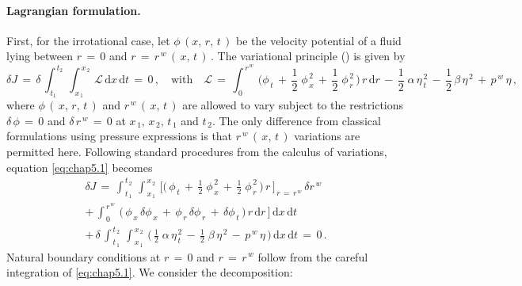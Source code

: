 \documentclass[alpha-refs, 12pt]{wiley-article}
\begin{document}
\paragraph{Lagrangian formulation.} First, for the irrotational case, let $\phi\,(x,\,r,\,t\,)$ be the velocity potential of a fluid lying between $r\,=\,0$ and $r\,=\,r^{\,w}\,(\,x,\,t\,)\,$. The variational principle (\cite{Luke1967}) is given by
\begin{equation}\label{eq:chap5.1}
  \delta J\,=\,\delta\,\int_{\,t_{1}}^{\,t_{2}}\,\int_{\,x_{\,1}}^{\,x_{\,2}}\,\mathcal{L}\,\mathrm{d}x\,\mathrm{d}t\,=\,0\,,\quad \text{with} \quad \mathcal{L}\,=\,\int_{\,0}^{\,r^{\,w}}\,\biggl(\phi_{\,t} \,+\,\frac{1}{2}\;\phi_{\,x}^{\,2} \,+\,\frac{1}{2}\;\phi_{\,r}^{\,2}\,\biggr)\,r\,\mathrm{d}r\,-\,\frac{1}{2}\;\alpha\,\eta_{\,t}^{\,2} \,-\,\frac{1}{2}\,\beta\,\eta^{\,2}\,+\,p^{\,w}\,\eta\,,
\end{equation}
where $\phi\,(\,x,\,r,\,t\,)$ and $r^{\,w}\,(\,x,\,t\,)$ are allowed to vary subject to the restrictions $\delta\,\phi\,=\,0$ and $\delta \,r^{\,w}\,=\,0$ at $x_{\,1},\,x_{\,2},\,t_{\,1}$ and $t_{\,2}$. The only difference from classical formulations using pressure expressions is that $r^{\,w}\,(\,x,\,t\,)$ variations are permitted here. Following standard procedures from the calculus of variations, equation \eqref{eq:chap5.1} becomes
\begin{multline}
  \delta J\,=\,\int_{\,t_{\,1}}^{\,t_{\,2}}\,\int_{\,x_{\,1}}^{\,x_{\,2}}\,\Biggl[\biggl(\,\phi_{\,t}\,+\,\frac{1}{2}\;\phi_{\,x}^{\,2}\,+\,\frac{1}{2}\;\phi_{\,r}^{\,2}\,\biggr)\,r\,\Biggr]_{\,r\,=\,r^{\,w}}\,\delta r^{\,w}
  \\[0.5em]
  +\,\int_{\,0}^{\,r^{\,w}}\,\bigl(\,\phi_{\,x}\,\delta \phi_{\,x}\,+\,\phi_{\,r}\,\delta \phi_{\,r}\,+\,\delta \phi_{\,t}\,\bigr)\,r\,\mathrm{d}r\,\Biggr]\,\mathrm{d}x\,\mathrm{d}t
  \\[0.5em]
  +\,\delta\,\int_{\,t_{\,1}}^{\,t_{\,2}}\,\int_{\,x_{\,1}}^{\,x_{\,2}}\,\biggl(\,\frac{1}{2}\;\alpha\,\eta_{\,t}^{\,2} \,-\,\frac{1}{2}\;\beta\,\eta^{\,2} \,-\,p^{\,w}\,\eta\,\biggr)\,\mathrm{d}x\,\mathrm{d}t\,=\,0\,.
\end{multline}
Natural boundary conditions at $r\,=\,0$ and $r\,=\,r^{\,w}$ follow from the careful integration of \eqref{eq:chap5.1}. We consider the decomposition:
\end{document}
